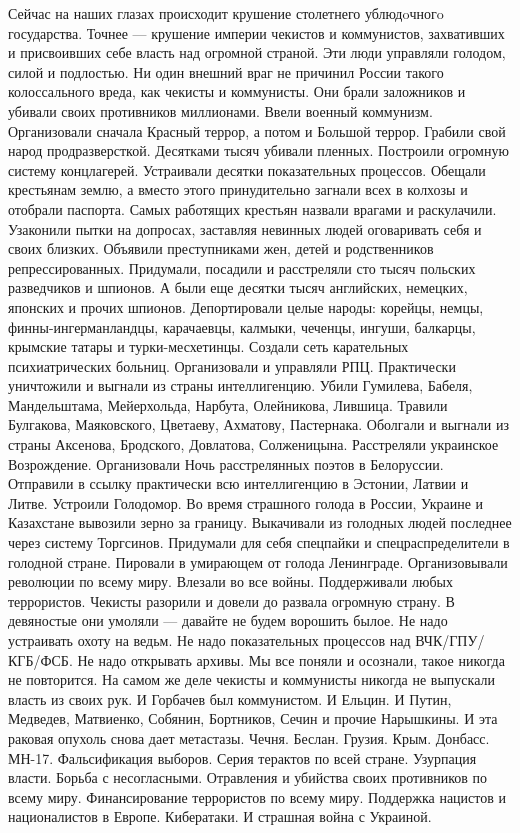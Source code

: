 
 
 
 
 

Сейчас на наших глазах происходит крушение столетнего ублюдoчногo государства. Точнее — крушение империи чекистов и коммунистов, захвативших и присвоивших себе власть над огромной страной. Эти люди управляли голодом, силой и подлостью. Ни один внешний враг не причинил России такого колоссального вреда, как чекисты и коммунисты. Они брали заложников и убивали своих противников миллионами. Ввели военный коммунизм. Организовали сначала Красный террор, а потом и Большой террор. Грабили свой народ продразверсткой. Десятками тысяч убивали пленных. Построили огромную систему концлагерей. Устраивали десятки показательных процессов. Обещали крестьянам землю, а вместо этого принудительно загнали всех в колхозы и отобрали паспорта. Самых работящих крестьян назвали врагами и раскулачили. Узаконили пытки на допросах, заставляя невинных людей оговаривать себя и своих близких. Объявили преступниками жен, детей и родственников репрессированных.
Придумали, посадили и расстреляли сто тысяч польских разведчиков и шпионов. А были еще десятки тысяч английских, немецких, японских и прочих шпионов. Депортировали целые народы: корейцы, немцы, финны-ингерманландцы, карачаевцы, калмыки, чеченцы, ингуши, балкарцы, крымские татары и турки-месхетинцы. Создали сеть карательных психиатрических больниц. Организовали и управляли РПЦ.
Практически уничтожили и выгнали из страны интеллигенцию. Убили Гумилева, Бабеля, Мандельштама, Мейерхольда, Нарбута, Олейникова, Лившица. Травили Булгакова, Маяковского, Цветаеву, Ахматову, Пастернака. Оболгали и выгнали из страны Аксенова, Бродского, Довлатова, Солженицына. Расстреляли украинское Возрождение. Организовали Ночь расстрелянных поэтов в Белоруссии. Отправили в ссылку практически всю интеллигенцию в Эстонии, Латвии и Литве.
Устроили Голодомор. Во время страшного голода в России, Украине и Казахстане вывозили зерно за границу. Выкачивали из голодных людей последнее через систему Торгсинов. Придумали для себя спецпайки и спецраспределители в голодной стране. Пировали в умирающем от голода Ленинграде. Организовывали революции по всему миру. Влезали во все войны. Поддерживали любых террористов.
Чекисты разорили и довели до развала огромную страну. В девяностые они умоляли — давайте не будем ворошить былое. Не надо устраивать охоту на ведьм. Не надо показательных процессов над ВЧК/ГПУ/КГБ/ФСБ. Не надо открывать архивы. Мы все поняли и осознали, такое никогда не повторится. На самом же деле чекисты и коммунисты никогда не выпускали власть из своих рук. И Горбачев был коммунистом. И Ельцин. И Путин, Медведев, Матвиенко, Собянин, Бортников, Сечин и прочие Нарышкины. И эта раковая опухоль снова дает метастазы. Чечня. Беслан. Грузия. Крым. Донбасс. МН-17. Фальсификация выборов. Серия терактов по всей стране. Узурпация власти. Борьба с несогласными. Отравления и убийства своих противников по всему миру. Финансирование террористов по всему миру. Поддержка нацистов и националистов в Европе. Кибератаки. И страшная война с Украиной.
